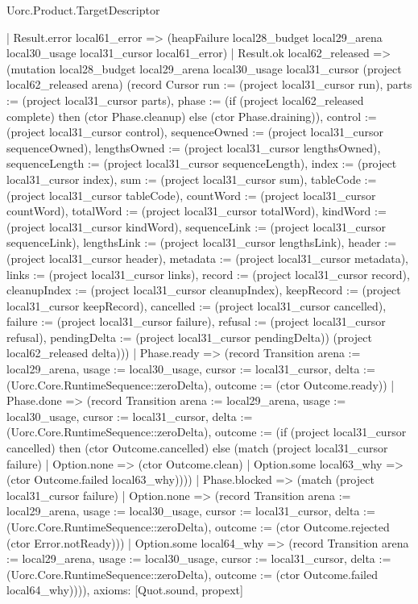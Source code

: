 \begin{lexlean}{Uorc.Product.TargetDescriptor}
\begin{semanticmodule}
{      | Result.error local61_error => (heapFailure local28_budget local29_arena local30_usage local31_cursor local61_error)
      | Result.ok local62_released => (mutation local28_budget local29_arena local30_usage local31_cursor (project local62_released arena) (record Cursor {run := (project local31_cursor run), parts := (project local31_cursor parts), phase := (if (project local62_released complete) then (ctor Phase.cleanup) else (ctor Phase.draining)), control := (project local31_cursor control), sequenceOwned := (project local31_cursor sequenceOwned), lengthsOwned := (project local31_cursor lengthsOwned), sequenceLength := (project local31_cursor sequenceLength), index := (project local31_cursor index), sum := (project local31_cursor sum), tableCode := (project local31_cursor tableCode), countWord := (project local31_cursor countWord), totalWord := (project local31_cursor totalWord), kindWord := (project local31_cursor kindWord), sequenceLink := (project local31_cursor sequenceLink), lengthsLink := (project local31_cursor lengthsLink), header := (project local31_cursor header), metadata := (project local31_cursor metadata), links := (project local31_cursor links), record := (project local31_cursor record), cleanupIndex := (project local31_cursor cleanupIndex), keepRecord := (project local31_cursor keepRecord), cancelled := (project local31_cursor cancelled), failure := (project local31_cursor failure), refusal := (project local31_cursor refusal), pendingDelta := (project local31_cursor pendingDelta)}) (project local62_released delta)))
    | Phase.ready => (record Transition {arena := local29_arena, usage := local30_usage, cursor := local31_cursor, delta := (Uorc.Core.RuntimeSequence::zeroDelta), outcome := (ctor Outcome.ready)})
    | Phase.done => (record Transition {arena := local29_arena, usage := local30_usage, cursor := local31_cursor, delta := (Uorc.Core.RuntimeSequence::zeroDelta), outcome := (if (project local31_cursor cancelled) then (ctor Outcome.cancelled) else (match (project local31_cursor failure)
      | Option.none => (ctor Outcome.clean)
      | Option.some local63_why => (ctor Outcome.failed local63_why)))})
    | Phase.blocked => (match (project local31_cursor failure)
      | Option.none => (record Transition {arena := local29_arena, usage := local30_usage, cursor := local31_cursor, delta := (Uorc.Core.RuntimeSequence::zeroDelta), outcome := (ctor Outcome.rejected (ctor Error.notReady))})
      | Option.some local64_why => (record Transition {arena := local29_arena, usage := local30_usage, cursor := local31_cursor, delta := (Uorc.Core.RuntimeSequence::zeroDelta), outcome := (ctor Outcome.failed local64_why)}))),
  axioms: [Quot.sound, propext]
}


\end{semanticmodule}
\end{lexlean}
